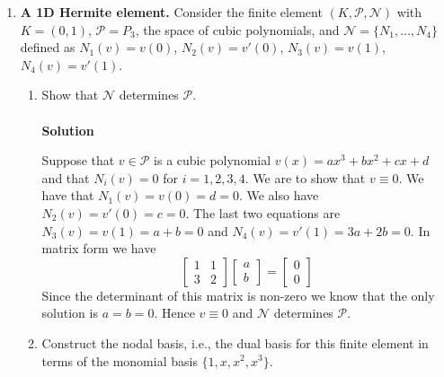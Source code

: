 \documentclass[11pt]{article}
\begin{document}
\begin{enumerate}
\begin{enumerate}
\end{enumerate}



\item {\bf A 1D Hermite element.}  Consider the finite element
  $(K,\mathcal P,\mathcal N)$ with $K=(0,1)$, $\mathcal P=P_3$, the
  space of cubic polynomials, and $\mathcal N=\{N_1,\ldots,N_4\}$
  defined as $N_1(v)=v(0)$, $N_2(v)=v'(0)$, $N_3(v)=v(1)$,
  $N_4(v)=v'(1)$.
  \begin{enumerate}
  \item Show that $\mathcal N$ determines $\mathcal P$.\\
\\

{\bf Solution}

Suppose that $v \in \mathcal P$ is a cubic polynomial $v(x) = ax^3 + bx^2 + cx + d$ and that $N_i(v) = 0$ for $i=1,2,3,4$.  We are to show that $v \equiv 0$.  We have that $N_1(v) = v(0) = d = 0$.  We also have $N_2(v) = v'(0) = c = 0$.  The last two equations are $N_3(v) = v(1) = a + b = 0$ and $N_4(v) = v'(1) = 3a + 2b = 0$.  In matrix form we have
\[
\begin{bmatrix}
1 & 1\\
3 & 2
\end{bmatrix}\begin{bmatrix}
a\\
b
\end{bmatrix} = \begin{bmatrix}
0\\
0
\end{bmatrix}
\]
Since the determinant of this matrix is non-zero we know that the only solution is $a = b = 0$.  Hence $v \equiv 0$ and $\mathcal N$ determines $\mathcal P$.



  \item Construct the nodal basis, i.e., the dual basis for this
    finite element in terms of the monomial basis
    $\{1,x,x^2,x^3\}$.\\
\\


\end{enumerate}
\end{enumerate}
\end{document}
